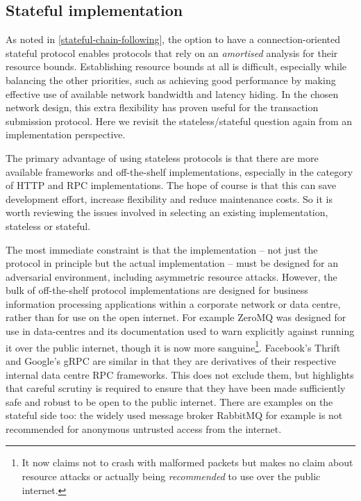 \documentclass[11pt,a4paper]{article}
\begin{document}
\subsection{Stateful implementation}
\label{stateful-implementation}

As noted in \cref{stateful-chain-following}, the option to have a connection-oriented stateful protocol
enables protocols that rely on an \emph{amortised} analysis for their
resource bounds. Establishing resource bounds at all is difficult,
especially while balancing the other priorities, such as achieving good
performance by making effective use of available network bandwidth and
latency hiding. In the chosen network design, this extra flexibility has
proven useful for the transaction submission protocol. Here we revisit
the stateless/stateful question again from an implementation
perspective.

The primary advantage of using stateless protocols is that there are
more available frameworks and off-the-shelf implementations, especially
in the category of HTTP and RPC implementations. The hope of course is
that this can save development effort, increase flexibility and reduce
maintenance costs. So it is worth reviewing the issues involved in
selecting an existing implementation, stateless or stateful.

The most immediate constraint is that the implementation -- not just the
protocol in principle but the actual implementation -- must be designed
for an adversarial environment, including asymmetric resource attacks.
However, the bulk of off-the-shelf protocol implementations are designed
for business information processing applications within a corporate
network or data centre, rather than for use on the open internet. For
example ZeroMQ was designed for use in data-centres and its
documentation used to warn explicitly against running it over the public
internet, though it is now more sanguine\footnote{It now claims not to
  crash with malformed packets but makes no claim about resource attacks
  or actually being \emph{recommended} to use over the public internet.}.
Facebook's Thrift and Google's gRPC are similar in that they are
derivatives of their respective internal data centre RPC frameworks.
This does not exclude them, but highlights that careful scrutiny is
required to ensure that they have been made sufficiently safe and robust
to be open to the public internet. There are examples on the stateful
side too: the widely used message broker RabbitMQ for example is not
recommended for anonymous untrusted access from the internet.
\end{document}
